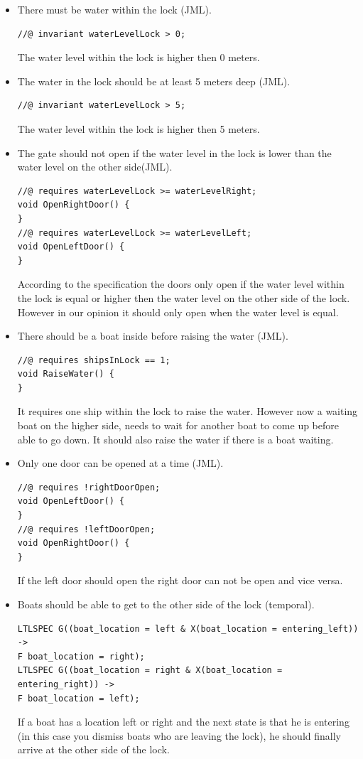 \documentclass[a4paper]{article}
\begin{document}
	\begin{itemize}
		\item There must be water within the lock (JML).
		\begin{lstlisting}
//@ invariant waterLevelLock > 0;
		\end{lstlisting}
		The water level within the lock is higher then 0 meters.
		
		\item The water in the lock should be at least 5 meters deep (JML).
		\begin{lstlisting}
//@ invariant waterLevelLock > 5;
		\end{lstlisting}
		The water level within the lock is higher then 5 meters.
		
		\item The gate should not open if the water level in the lock is lower than the water level on the other side(JML).
		\begin{lstlisting}
//@ requires waterLevelLock >= waterLevelRight;
void OpenRightDoor() {
}
//@ requires waterLevelLock >= waterLevelLeft;
void OpenLeftDoor() {
}
		\end{lstlisting}
		According to the specification the doors only open if the water level within the lock is equal or higher then the water level on the other side of the lock. However in our opinion it should only open when the water level is equal.
		
		\item There should be a boat inside before raising the water (JML).
		\begin{lstlisting}
//@ requires shipsInLock == 1;
void RaiseWater() {
}
		\end{lstlisting}
		It requires one ship within the lock to raise the water. However now a waiting boat on the higher side, needs to wait for another boat to come up before able to go down. It should also raise the water if there is a boat waiting.
		
		\item Only one door can be opened at a time (JML).
		\begin{lstlisting}
//@ requires !rightDoorOpen;
void OpenLeftDoor() {
}
//@ requires !leftDoorOpen;
void OpenRightDoor() {
}	
		\end{lstlisting}
		If the left door should open the right door can not be open and vice versa.
		
		\item Boats should be able to get to the other side of the lock (temporal).
		\begin{lstlisting}
LTLSPEC G((boat_location = left & X(boat_location = entering_left)) ->
F boat_location = right);
LTLSPEC G((boat_location = right & X(boat_location = entering_right)) ->
F boat_location = left);
		\end{lstlisting}
		If a boat has a location left or right and the next state is that he is entering (in this case you dismiss boats who are leaving the lock), he should finally arrive at the other side of the lock. 
		

\end{itemize}
\end{document}
